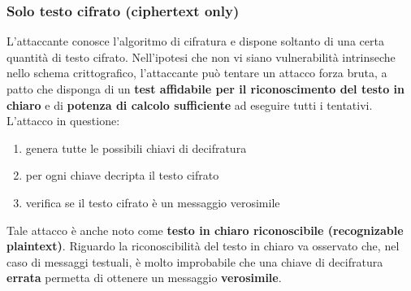 \subsubsection{Solo testo cifrato (ciphertext only)}
L'attaccante conosce l'algoritmo di cifratura e dispone soltanto di una certa quantità di testo cifrato. Nell'ipotesi che non vi siano vulnerabilità intrinseche nello schema crittografico, l'attaccante può tentare un attacco forza bruta, a patto che disponga di un \textbf{test affidabile per il riconoscimento del testo in chiaro} e di \textbf{potenza di calcolo sufficiente} ad eseguire tutti i tentativi. L'attacco in questione:
\begin{enumerate}
  \item genera tutte le possibili chiavi di decifratura
  \item per ogni chiave decripta il testo cifrato
  \item verifica se il testo cifrato è un messaggio verosimile
\end{enumerate} 

Tale attacco è anche noto come \textbf{testo in chiaro riconoscibile (recognizable plaintext)}. Riguardo la riconoscibilità del testo in chiaro va osservato che, nel caso di messaggi testuali, è molto improbabile che una chiave di decifratura \textbf{errata} permetta di ottenere un messaggio \textbf{verosimile}. \\

